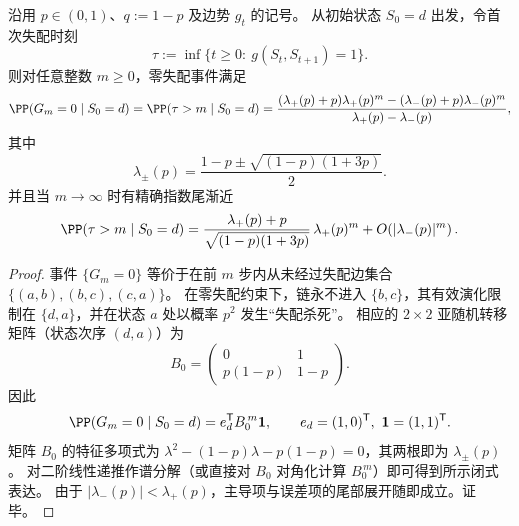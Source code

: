 \begin{theorem}[零失配事件的全闭式与首次失配时刻的精确尾分布]\label{thm:fold-bernoulli-p-zero-mismatch-exact-tail}
沿用 \(p\in(0,1)\)、\(q:=1-p\) 及边势 \(g_t\) 的记号。
从初始状态 \(S_0=d\) 出发，令首次失配时刻
\[
\tau:=\inf\{t\ge 0:\ g(S_t,S_{t+1})=1\}.
\]
则对任意整数 \(m\ge 0\)，零失配事件满足
\[
\PP(G_m=0\mid S_0=d)=\PP(\tau>m\mid S_0=d)
=\frac{(\lambda_+(p)+p)\lambda_+(p)^{m}-(\lambda_-(p)+p)\lambda_-(p)^{m}}{\lambda_+(p)-\lambda_-(p)},
\]
其中
\[
\lambda_\pm(p)=\frac{1-p\pm\sqrt{(1-p)(1+3p)}}{2}.
\]
并且当 \(m\to\infty\) 时有精确指数尾渐近
\[
\PP(\tau>m\mid S_0=d)
=\frac{\lambda_+(p)+p}{\sqrt{(1-p)(1+3p)}}\,\lambda_+(p)^{m}
+O\!\left(|\lambda_-(p)|^{m}\right).
\]
\end{theorem}
\begin{proof}
事件 \(\{G_m=0\}\) 等价于在前 \(m\) 步内从未经过失配边集合 \(\{(a,b),(b,c),(c,a)\}\)。
在零失配约束下，链永不进入 \(\{b,c\}\)，其有效演化限制在 \(\{d,a\}\)，并在状态 \(a\) 处以概率 \(p^2\) 发生“失配杀死”。
相应的 \(2\times 2\) 亚随机转移矩阵（状态次序 \((d,a)\)）为
\[
B_0=
\begin{pmatrix}
0 & 1\\
p(1-p) & 1-p
\end{pmatrix}.
\]
因此
\[
\PP(G_m=0\mid S_0=d)=e_d^{\mathsf T}B_0^{\,m}\mathbf 1,
\qquad
e_d=(1,0)^{\mathsf T},\ \mathbf 1=(1,1)^{\mathsf T}.
\]
矩阵 \(B_0\) 的特征多项式为
\(
\lambda^2-(1-p)\lambda-p(1-p)=0
\)，其两根即为 \(\lambda_\pm(p)\)。
对二阶线性递推作谱分解（或直接对 \(B_0\) 对角化计算 \(B_0^{\,m}\)）即可得到所示闭式表达。
由于 \(|\lambda_-(p)|<\lambda_+(p)\)，主导项与误差项的尾部展开随即成立。证毕。
\end{proof}

\endinput
